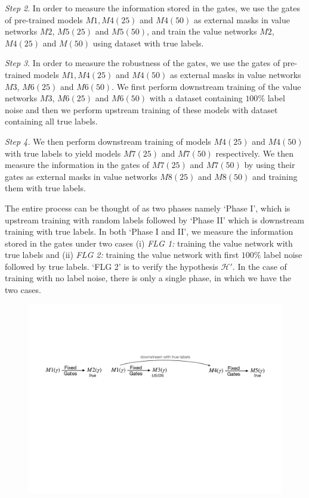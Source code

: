 \indent \emph{Step 2}. In order to measure the information stored in the gates, we use the gates of pre-trained models $M1, M4(25)$ and $M4(50)$ as external masks in value networks $M2$, $M5(25)$ and $M5(50)$, and train the value networks $M2$, $M4(25)$ and $M(50)$ using dataset with true labels.

\indent \emph{Step 3}. In order to measure the robustness of the gates, we use the gates of pre-trained models $M1, M4(25)$ and $M4(50)$ as external masks in value networks $M3$, $M6(25)$ and $M6(50)$. We first perform downstream training of the value networks $M3$, $M6(25)$ and $M6(50)$ with a dataset containing $100\%$ label noise and then we perform upstream training of these models with dataset containing all true labels.

\indent \emph{Step 4.} We then perform downstream training of models $M4(25)$ and $M4(50)$ with true labels to yield models $M7(25)$ and $M7(50)$ respectively. We then measure the information in the gates of $M7(25)$ and $M7(50)$ by using their gates as external masks in value networks $M8(25)$ and $M8(50)$ and training them with true labels.

The entire process can be thought of as two phases namely  `Phase I', which is upstream training with random labels followed by `Phase II' which is downstream training with true labels. In both `Phase I and II', we measure the information stored in the gates under two cases (i) \emph{FLG 1:} training the value network with true labels and (ii) \emph{FLG 2:} training the value network with first $100\%$ label noise followed by true labels. `FLG 2' is to verify the hypothesis $\mathcal{H'}$. In the case of training with no label noise, there is only a single phase, in which we have the two cases.

\begin{figure}
\centering
\includegraphics[scale=0.3]{figs/rand-label.pdf}
\end{figure}




